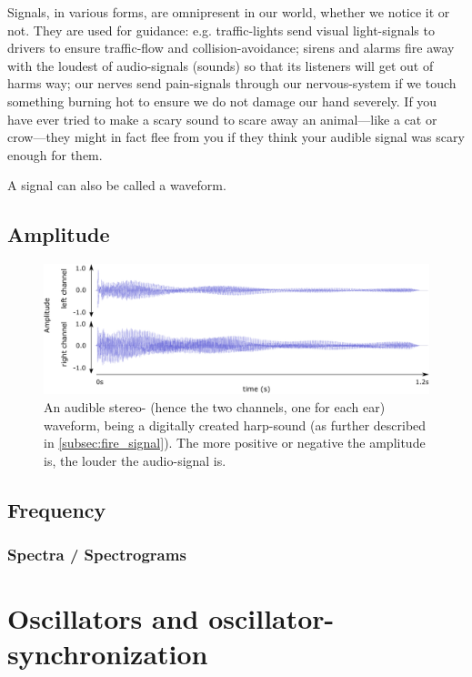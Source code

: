 	Signals, in various forms, are omnipresent in our world, whether we notice it or not. They are used for guidance: e.g. traffic-lights send visual light-signals to drivers to ensure traffic-flow and collision-avoidance; sirens and alarms fire away with the loudest of audio-signals (sounds) so that its listeners will get out of harms way; our nerves send pain-signals through our nervous-system if we touch something burning hot to ensure we do not damage our hand severely. If you have ever tried to make a scary sound to scare away an animal—like a cat or crow—they might in fact flee from you if they think your audible signal was scary enough for them.
	
	A signal can also be called a waveform.

	\subsection{Amplitude}

	\begin{figure}[!ht]
		\centering
		\includegraphics[width=\linewidth]{Assets/Figures/Illustrations/waveform.pdf}
		\caption[An audible waveform explained.]{An audible stereo- (hence the two channels, one for each ear) waveform, being a digitally created harp-sound (as further described in \ref{subsec:fire_signal}). The more positive or negative the amplitude is, the louder the audio-signal is.}
		\label{fig:waveform}
	\end{figure}


	\subsection{Frequency}
	
		\subsubsection{Spectra / Spectrograms}





\section{Oscillators and oscillator-synchronization}

